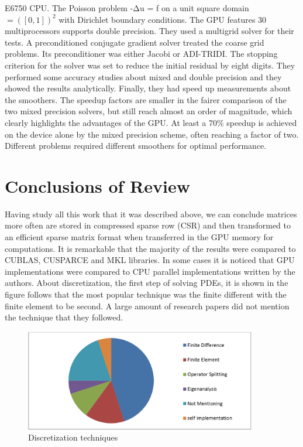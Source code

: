 E6750 CPU. The Poisson problem -Δu = f on a unit square domain  $= ([0,1])^2$ with Dirichlet boundary conditions. The GPU features 30 multiprocessors supports double precision. They used a multigrid solver for their tests. A preconditioned conjugate gradient solver treated the coarse grid problems. Its preconditioner was either Jacobi or ADI-TRIDI. The stopping criterion for the solver was set to reduce the initial residual by eight digits. They performed some accuracy studies about mixed and double precision and they showed the results analytically. Finally, they had speed up measurements about the smoothers. The speedup factors are smaller in the fairer comparison of the two mixed precision solvers, but still reach almost an order of magnitude, which clearly highlights the advantages of the GPU. At least a 70\% speedup is achieved on the device alone by the mixed precision scheme, often reaching a factor of two. Different problems required different smoothers for optimal performance.




\section{Conclusions of Review}

Having study all this work that it was described above, we can conclude matrices more often are stored in compressed sparse row (CSR) and then transformed to an efficient sparse matrix format when transferred in the GPU memory for computations.
It is remarkable that the majority of the results were compared to CUBLAS, CUSPARCE and MKL libraries. In some cases it is noticed that GPU implementations were compared to CPU parallel implementations written by the authors.
About discretization, the first step of solving PDEs, it is shown in the figure follows that the most popular technique was the finite different with the finite element to be second. A large amount of research papers did not mention the technique that they followed.

 \begin{figure}[H]
    \centering
        \includegraphics[totalheight=0.3\textheight,width=0.9\textwidth]{review_conclusion.png}
    \caption{Discretization techniques}
    \label{fig:Conclusion Graph}
\end{figure}

